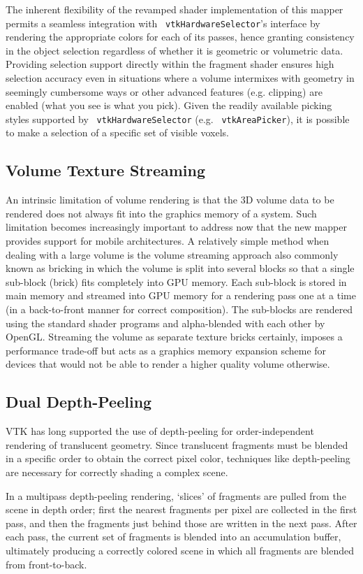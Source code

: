 The inherent flexibility of the revamped shader implementation of this mapper
permits a seamless integration with ~\texttt{vtkHardwareSelector}'s interface by
rendering the appropriate colors for each of its passes, hence granting
consistency in the object selection regardless of whether it is geometric or
volumetric data.  Providing selection support directly within the fragment
shader ensures high selection accuracy even in situations where a volume
intermixes with geometry in seemingly cumbersome ways or other advanced features
(e.g. clipping) are enabled (what you see is what you pick).  Given the readily
available picking styles supported by ~\texttt{vtkHardwareSelector} (e.g.
~\texttt{vtkAreaPicker}), it is possible to make a selection of a specific set
of visible voxels.

\subsection{Volume Texture Streaming} An intrinsic limitation of volume
rendering is that the 3D volume data to be rendered does not always fit into the
graphics memory of a system. Such limitation becomes increasingly important to
address now that the new mapper provides support for mobile architectures.  A
relatively simple method when dealing with a large volume is the volume
streaming approach also commonly known as bricking in which the volume is split
into several blocks so that a single sub-block (brick) fits completely into GPU
memory.  Each sub-block is stored in main memory and streamed into GPU memory
for a rendering pass one at a time (in a back-to-front manner for correct
composition). The sub-blocks are rendered using the standard shader programs and
alpha-blended with each other by OpenGL. Streaming the volume as separate
texture bricks certainly, imposes a performance trade-off but acts as a graphics
memory expansion scheme for devices that would not be able to render a higher
quality volume otherwise.

\subsection{Dual Depth-Peeling} VTK has long supported the use of depth-peeling
for order-independent rendering of translucent geometry. Since translucent
fragments must be blended in a specific order to obtain the correct pixel color,
techniques like depth-peeling are necessary for correctly shading a complex
scene.

In a multipass depth-peeling rendering, `slices' of fragments are pulled from
the scene in depth order; first the nearest fragments per pixel are collected in
the first pass, and then the fragments just behind those are written in the next
pass. After each pass, the current set of fragments is blended into an
accumulation buffer, ultimately producing a correctly colored scene in which all
fragments are blended from front-to-back.

